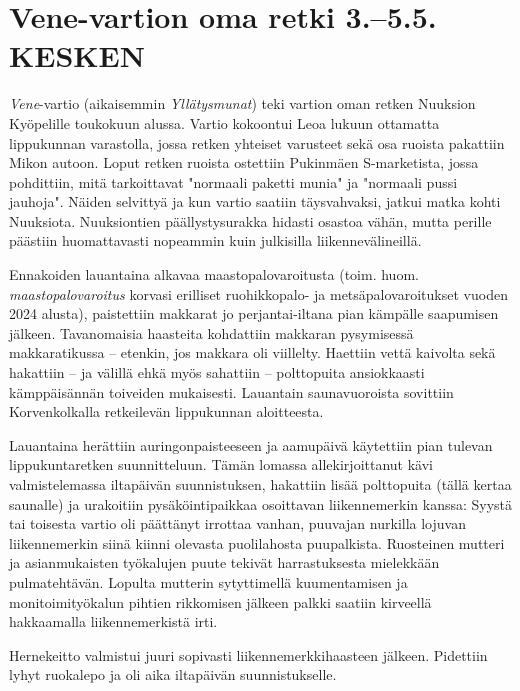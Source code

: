 
\section{Vene-vartion oma retki 3.–5.5. KESKEN}



\begin{multicols}{2}

\textit{Vene}-vartio (aikaisemmin \mbox{\textit{Yllätysmunat}}) teki vartion oman retken Nuuksion Kyöpelille toukokuun alussa. Vartio kokoontui Leoa lukuun ottamatta lippukunnan varastolla, jossa retken yhteiset varusteet sekä osa ruoista pakattiin Mikon autoon. Loput retken ruoista ostettiin Pukinmäen S-marketista, jossa pohdittiin, mitä tarkoittavat "normaali paketti munia" ja "normaali pussi jauhoja". Näiden selvittyä ja kun vartio saatiin täysvahvaksi, jatkui matka kohti Nuuksiota. Nuuksiontien päällystysurakka hidasti osastoa vähän, mutta perille päästiin huomattavasti nopeammin kuin julkisilla liikennevälineillä.

Ennakoiden lauantaina alkavaa maastopalovaroitusta (toim. huom. \textit{maastopalovaroitus} korvasi erilliset ruohikkopalo- ja metsäpalovaroitukset vuoden 2024 alusta), paistettiin makkarat jo perjantai-iltana pian kämpälle saapumisen jälkeen. Tavanomaisia haasteita kohdattiin makkaran pysymisessä makkaratikussa – etenkin, jos makkara oli viillelty. Haettiin vettä kaivolta sekä hakattiin – ja välillä ehkä myös sahattiin – polttopuita ansiokkaasti kämppäisännän toiveiden mukaisesti. Lauantain saunavuoroista sovittiin Korvenkolkalla retkeilevän lippukunnan aloitteesta.

Lauantaina herättiin auringonpaisteeseen ja aamupäivä käytettiin pian tulevan lippukuntaretken suunnitteluun. Tämän lomassa allekirjoittanut kävi valmistelemassa iltapäivän suunnistuksen, hakattiin lisää polttopuita (tällä kertaa saunalle) ja urakoitiin pysäköintipaikkaa osoittavan liikennemerkin kanssa: Syystä tai toisesta vartio oli päättänyt irrottaa vanhan, puuvajan nurkilla lojuvan liikennemerkin siinä kiinni olevasta puolilahosta puupalkista. Ruosteinen mutteri ja asianmukaisten työkalujen puute tekivät harrastuksesta mielekkään pulmatehtävän. Lopulta mutterin sytyttimellä kuumentamisen ja monitoimityökalun pihtien rikkomisen jälkeen palkki saatiin kirveellä hakkaamalla liikennemerkistä irti.

Hernekeitto valmistui juuri sopivasti liikennemerkkihaasteen jälkeen. Pidettiin lyhyt ruokalepo ja oli aika iltapäivän suunnistukselle.


\end{multicols}
